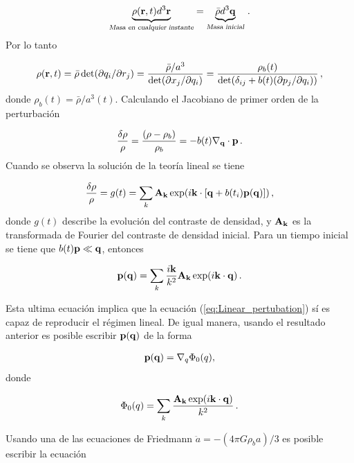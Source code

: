 \begin{align}
\underbrace{\rho({\bf{r}},t)d^{3}{\bf{r}}}_{{\textsl{Masa\ en\ cualquier\ instante}}} = \underbrace{\bar{\rho}d^{3}{\bf{q}}}_{{\textsl{Masa\  inicial}}} \,.
\end{align}
%
Por lo tanto

\begin{align}
\rho({\bf{r}},t) = \bar{\rho}\det(\partial q_{i}/\partial r_{j})=\frac{\bar{\rho}/a^{3}}{\det(\partial x_{j}/\partial q_{i})} = \frac{\rho_{b}(t)}{\det(\delta_{ij} + b(t)(\partial p_{j}/ \partial q_{i}))}\,,
\label{eq:density}
\end{align}
%
donde $\rho_{b}(t)=\bar{\rho}/a^{3}(t)$. Calculando el Jacobiano de primer orden de la perturbación

\begin{align}
\frac{\delta\rho}{\rho}=\frac{(\rho-\rho_{b})}{\rho_{b}} = -b(t)\bf{\nabla_{q}\cdot p }\,.
\label{eq:Underdensity}
\end{align}
%
Cuando se observa la solución de la teoría lineal se tiene 

\begin{align}
\frac{\delta\rho}{\rho}=g(t)=\sum_{k}{\bf{A_{k}}}\exp(i{\bf{k}}\cdot[{\bf{q}}+b(t_{i}){\bf{p(q)}}])\,,
\end{align}
%
donde $g(t)$ describe la evolución del contraste de densidad, y ${\bf{A_{k}}}$ es la transformada de Fourier del contraste de densidad inicial. Para un tiempo inicial se tiene que $b(t){\bf{p}}\ll {\bf{q}}$, entonces

\begin{align}
{\bf{p(q)}}=\sum_{k}\frac{i{\bf{k}}}{k^{2}}{\bf{A_{k}}}\exp(i{\bf{k\cdot q}})\,.
\end{align}

Esta ultima ecuación implica que la ecuación (\ref{eq:Linear_pertubation}) sí es capaz de reproducir el régimen lineal. De igual manera, usando el resultado anterior es posible escribir ${\bf{p(q)}}$ de la forma

\begin{align}
{\bf{p(q)}} = \nabla_{q}\Phi_{0}(q), 
\end{align}
%
donde 

\begin{align}
\Phi_{0}(q) = \sum_{k}\frac{{\bf{A_{k}}}\exp(i{\bf{k\cdot q}})}{k^{2}}\,.
\end{align}

Usando una de las ecuaciones de Friedmann $\ddot{a}=-(4\pi G\rho_{b}a)/3$ es posible escribir la ecuación

